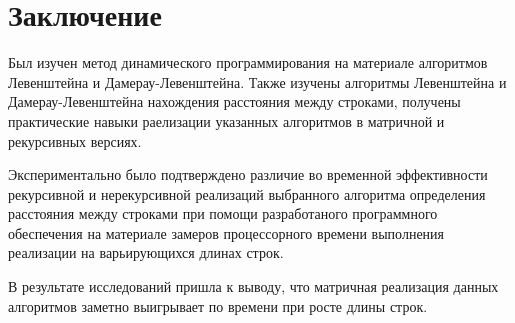 \documentclass[12pt]{report}
\begin{document}
\chapter*{Заключение}
Был изучен метод динамического программирования на материале алгоритмов Левенштейна и Дамерау-Левенштейна.
Также изучены алгоритмы Левенштейна и Дамерау-Левенштейна нахождения расстояния между строками, получены практические навыки раелизации указанных алгоритмов
в матричной  и рекурсивных версиях. 

Экспериментально было подтверждено различие во временной эффективности рекурсивной и нерекурсивной реализаций выбранного алгоритма определения расстояния между строками при помощи разработаного программного обеспечения на материале замеров процессорного времени выполнения реализации на варьирующихся длинах строк. 

В результате исследований пришла к выводу, что матричная реализация данных алгоритмов заметно выигрывает по времени при росте длины строк.
\end{document}
